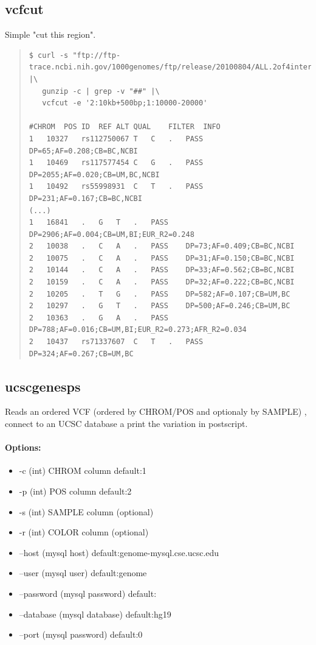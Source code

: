 \documentclass[12pt]{article}
\begin{document}
\subsection{vcfcut}
Simple "cut this region".
\begin{quote}
\begin{verbatim}
$ curl -s "ftp://ftp-trace.ncbi.nih.gov/1000genomes/ftp/release/20100804/ALL.2of4intersection.20100804.sites.vcf.gz" |\
   gunzip -c | grep -v "##" |\
   vcfcut -e '2:10kb+500bp;1:10000-20000'
   
#CHROM	POS	ID	REF	ALT	QUAL	FILTER	INFO
1	10327	rs112750067	T	C	.	PASS	DP=65;AF=0.208;CB=BC,NCBI
1	10469	rs117577454	C	G	.	PASS	DP=2055;AF=0.020;CB=UM,BC,NCBI
1	10492	rs55998931	C	T	.	PASS	DP=231;AF=0.167;CB=BC,NCBI
(...)
1	16841	.	G	T	.	PASS	DP=2906;AF=0.004;CB=UM,BI;EUR_R2=0.248
2	10038	.	C	A	.	PASS	DP=73;AF=0.409;CB=BC,NCBI
2	10075	.	C	A	.	PASS	DP=31;AF=0.150;CB=BC,NCBI
2	10144	.	C	A	.	PASS	DP=33;AF=0.562;CB=BC,NCBI
2	10159	.	C	A	.	PASS	DP=32;AF=0.222;CB=BC,NCBI
2	10205	.	T	G	.	PASS	DP=582;AF=0.107;CB=UM,BC
2	10297	.	G	T	.	PASS	DP=500;AF=0.246;CB=UM,BC
2	10363	.	G	A	.	PASS	DP=788;AF=0.016;CB=UM,BI;EUR_R2=0.273;AFR_R2=0.034
2	10437	rs71337607	C	T	.	PASS	DP=324;AF=0.267;CB=UM,BC
\end{verbatim}
\end{quote}
\subsection{ucscgenesps}
Reads an ordered VCF (ordered by CHROM/POS and optionaly by SAMPLE) , connect to an UCSC database a print the
variation in postscript.
\paragraph{Options:}
\begin{itemize}
\item-c (int) CHROM column default:1
\item-p (int) POS column default:2
\item-s (int) SAMPLE column (optional) 
\item-r (int) COLOR column (optional)
\item--host (mysql host) default:genome-mysql.cse.ucsc.edu
\item--user (mysql user) default:genome
\item--password (mysql password) default:
\item--database (mysql database) default:hg19
\item--port (mysql password) default:0
\end{itemize}
\end{document}
